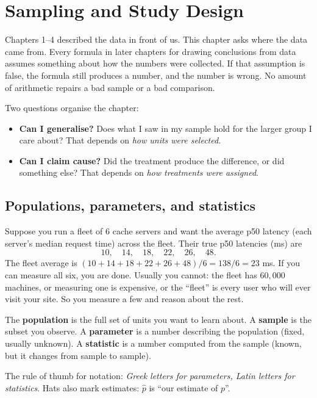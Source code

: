 \chapter{Sampling and Study Design}
\label{ch:sampling}

Chapters 1--4 described the data in front of us. This chapter asks where the data came
from. Every formula in later chapters for drawing conclusions from data assumes
something about how the numbers were collected. If that assumption
is false, the formula still produces a number, and the number is wrong. No amount of
arithmetic repairs a bad sample or a bad comparison.

Two questions organise the chapter:
\begin{itemize}
  \item \textbf{Can I generalise?} Does what I saw in my sample hold for the larger group I
  care about? That depends on \emph{how units were selected}.
  \item \textbf{Can I claim cause?} Did the treatment produce the difference, or did
  something else? That depends on \emph{how treatments were assigned}.
\end{itemize}

\section{Populations, parameters, and statistics}
\label{sec:sampling-pop}

Suppose you run a fleet of $6$ cache servers and want the average p50 latency (each
server's median request time) across the fleet. Their true p50 latencies (ms) are
\[
  10,\quad 14,\quad 18,\quad 22,\quad 26,\quad 48 .
\]
The fleet average is $(10+14+18+22+26+48)/6 = 138/6 = 23$ ms. If you can measure all six,
you are done. Usually you cannot: the fleet has $60{,}000$ machines, or measuring one is
expensive, or the ``fleet'' is every user who will ever visit your site. So you measure a
few and reason about the rest.

\begin{definition}
The \textbf{population} is the full set of units you want to learn about. A
\textbf{sample} is the subset you observe. A \textbf{parameter} is a number
describing the population (fixed, usually unknown). A \textbf{statistic} is a number
computed from the sample (known, but it changes from sample to sample).
\end{definition}

The rule of thumb for notation: \emph{Greek letters for parameters, Latin letters for
statistics}. Hats also mark estimates: $\hat p$ is ``our estimate of $p$''.

